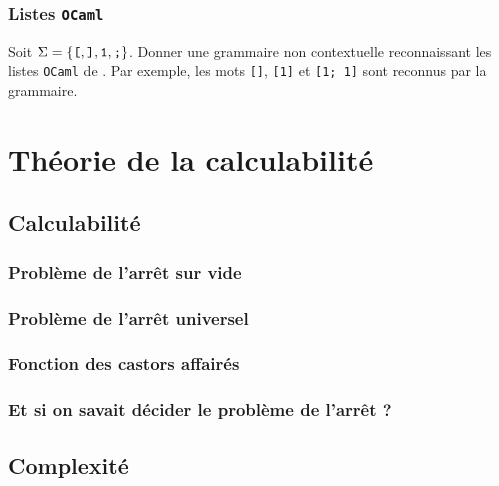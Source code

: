 \documentclass[a4paper,french,bookmarks]{book}
\newcommand{\langOcaml}{\texttt{\color{ocamlColor!20!black}OCaml}}
\begin{document}
    \subsection{Listes \langOcaml{}}
    
    Soit $\Sigma = \left\{\texttt{[}, \texttt{]}, \texttt{1}, \texttt{;}\right\}$. Donner une grammaire non contextuelle reconnaissant les listes \langOcaml{} de . Par exemple, les mots \texttt{[]}, \texttt{[1]} et \texttt{[1; 1]} sont reconnus par la grammaire.
    

    \chapter{Théorie de la calculabilité}

    \section{Calculabilité}

    \subsection{Problème de l'arrêt sur vide}

    \subsection{Problème de l'arrêt universel}

    \subsection{Fonction des castors affairés}

    \subsection{Et si on savait décider le problème de l’arrêt ?}

    \section{Complexité}
\end{document}
